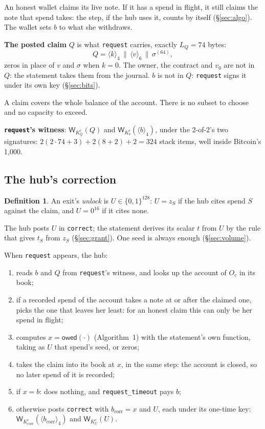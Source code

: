 \documentclass[11pt]{article}
\theoremstyle{plain}
\theoremstyle{definition}
\newtheorem{definition}{Definition}
\newcommand{\bcorr}{b_{\mathrm{corr}}}
\newcommand{\tx}[1]{\texttt{#1}}
\newcommand{\be}[2]{\langle #1\rangle_{#2}}
\newcommand{\Wots}{\mathsf{W}}
\newcommand{\owed}{\mathsf{owed}}
\newcommand{\Oc}{O_c}
\newcommand{\KQ}{K_{Q}^{c}}
\newcommand{\Kb}{K_{b}^{c}}
\newcommand{\Kcorr}{K_{\mathrm{corr}}^{c}}
\newcommand{\KU}{K_{U}^{c}}
\begin{document}
An honest wallet claims its live note. If it has a spend in flight, it
still claims the note that spend takes: the step, if the hub uses it,
counts by itself (\S\ref{sec:algo}). The wallet sets $b$ to what she
withdraws.

\textbf{The posted claim} $Q$ is what \tx{request} carries, exactly
$L_Q = 74$ bytes:
\[
  Q = \be{k}{4} \,\|\, \be{v}{6} \,\|\, \sigma^{(64)},
\]
zeros in place of $v$ and $\sigma$ when $k = 0$. The owner, the contract
and $v_0$ are not in $Q$: the statement takes them from the journal.
$b$ is not in $Q$: \tx{request} signs it under its own key
(\S\ref{sec:bits}).

A claim covers the whole balance of the account. There is no subset to
choose and no capacity to exceed.

\textbf{\tx{request}'s witness}: $\Wots_{\KQ}(Q)$ and
$\Wots_{\Kb}(\be{b}{4})$, under the 2-of-2's two signatures: $2(2 \cdot
74 + 3) + 2(8 + 2) + 2 = 324$ stack items, well inside Bitcoin's 1,000.

\subsection{The hub's correction}\label{sec:correct}

\begin{definition}
An exit's \emph{unlock} is $U \in \{0,1\}^{128}$: $U = z_S$ if the hub
cites spend $S$ against the claim, and $U = 0^{16}$ if it cites none.
\end{definition}

The hub posts $U$ in \tx{correct}; the statement derives its scalar $t$
from $U$ by the rule that gives $t_S$ from $z_S$ (\S\ref{sec:grant}).
One seed is always enough (\S\ref{sec:volume}).

When \tx{request} appears, the hub:
\begin{enumerate}[nosep]
\item reads $b$ and $Q$ from \tx{request}'s witness, and looks up the
  account of $\Oc$ in its book;
\item if a recorded spend of the account takes a note at or after the
  claimed one, picks the one that leaves her least: for an honest claim
  this can only be her spend in flight;
\item computes $x = \owed(\cdot)$ (Algorithm~1) with the statement's own
  function, taking as $U$ that spend's seed, or zeros;
\item takes the claim into its book at $x$, in the same step: the
  account is closed, so no later spend of it is recorded;
\item if $x = b$: does nothing, and \tx{request\_timeout} pays $b$;
\item otherwise posts \tx{correct} with $\bcorr = x$ and $U$, each under
  its one-time key: $\Wots_{\Kcorr}(\be{\bcorr}{4})$ and
  $\Wots_{\KU}(U)$.
\end{enumerate}
\end{document}
